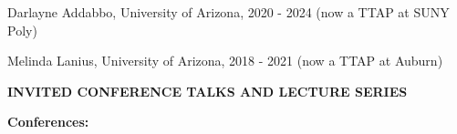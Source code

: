 \documentclass[a4paper, 12pt]{article}
\begin{document}
\begin{compactitem}
\item Darlayne Addabbo, University of Arizona, 2020 - 2024 (now a TTAP at SUNY Poly)
\item Melinda Lanius, University of Arizona, 2018 - 2021 (now a TTAP at Auburn)
\end{compactitem}
\par\quad\par
\textbf{INVITED CONFERENCE TALKS AND LECTURE SERIES}\par\smallskip
\textbf{Conferences:}
\end{document}
